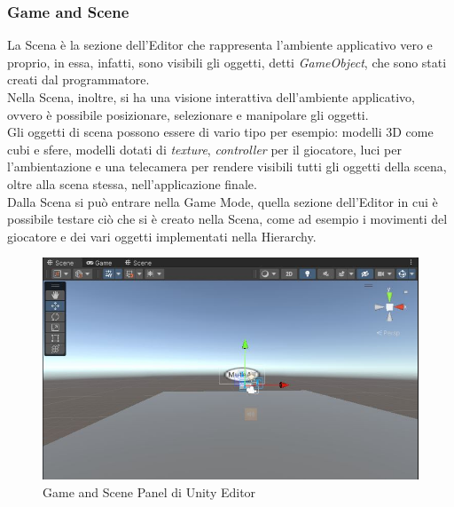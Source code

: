 \subsubsection{Game and Scene}
La Scena\cite{unityScene} è la sezione dell'Editor che rappresenta l'ambiente applicativo vero e proprio, in essa, infatti, sono visibili gli oggetti, detti \textit{GameObject}, che sono stati creati dal programmatore.\\Nella Scena, inoltre, si ha una visione interattiva dell'ambiente applicativo, ovvero è possibile posizionare, selezionare e manipolare gli oggetti.
\\Gli oggetti di scena possono essere di vario tipo per esempio: modelli 3D come cubi e sfere, modelli dotati di \textit{texture}, \textit{controller} per il giocatore, luci per l'ambientazione e una telecamera per rendere visibili tutti gli oggetti della scena, oltre alla scena stessa, nell'applicazione finale.
\\Dalla Scena si può entrare nella Game Mode\cite{unityGame}, quella sezione dell'Editor in cui è possibile testare ciò che si è creato nella Scena, come ad esempio i movimenti del giocatore e dei vari oggetti implementati nella Hierarchy.
\begin{figure}[H]
    \centering
    \includegraphics[scale = 0.6]{Immagini/Cattura.jpg}
    \caption{Game and Scene Panel di Unity Editor}
    \label{fig:my_label}
\end{figure}
